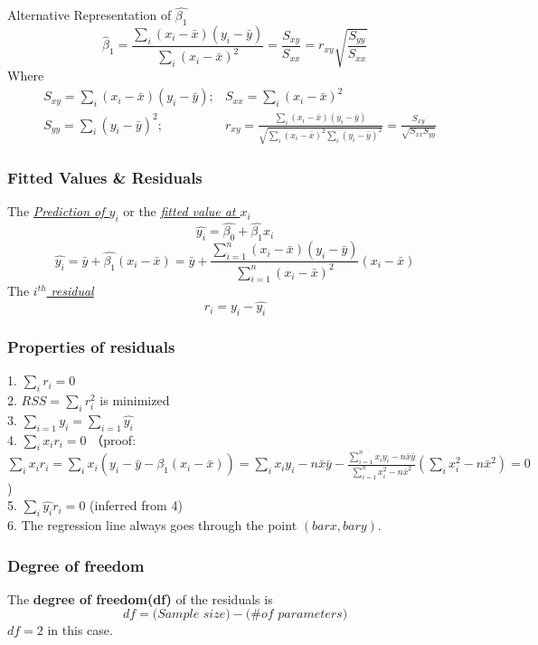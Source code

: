 \documentclass[11pt,a4paper]{article}
\begin{document}
Alternative Representation of $\hat{\beta_1}$
$$\hat{\beta}_{1}=\frac{\sum_{i}\left(x_{i}-\bar{x}\right)\left(y_{i}-\bar{y}\right)}{\sum_{i}\left(x_{i}-\bar{x}\right)^{2}}=\frac{S_{x y}}{S_{x x}}=r_{x y} \sqrt{\frac{S_{y y}}{S_{x x}}}$$
Where 
\begin{equation}
    \begin{aligned}
        &S_{xy}=\sum_{i}\left(x_{i}-\bar{x}\right)\left(y_{i}-\bar{y}\right); &S_{xx}=\sum_{i}\left(x_{i}-\bar{x}\right)^{2}\\
        &S_{yy}=\sum_{i}\left(y_{i}-\bar{y}\right)^{2}; &r_{xy}=\frac{\sum_{i}\left(x_{i}-\bar{x}\right)\left(y_{i}-\bar{y}\right)}{\sqrt{\sum_{i}\left(x_{i}-\bar{x}\right)^{2}\sum_{i}\left(y_{i}-\bar{y}\right)^{2}}}=\frac{S_{xy}}{\sqrt{S_{xx}S_{yy}}}
    \end{aligned}
    \nonumber
\end{equation}

\subsubsection{Fitted Values \& Residuals}
The \underline{\textit{Prediction of $y_i$}} or the \underline{\textit{fitted value at $x_i$}}
$$\hat{y_i}=\hat{\beta_0}+\hat{\beta_1}x_i$$
$$\hat{y_i}=\bar{y}+\hat{\beta_1}(x_i-\bar{x})=\bar{y}+\frac{\sum_{i=1}^{n}\left(x_{i}-\bar{x}\right)\left(y_{i}-\bar{y}\right)}{\sum_{i=1}^{n}\left(x_{i}-\bar{x}\right)^{2}}(x_i-\bar{x})$$
The \underline{\textit{$i^{th}$ residual}}
$$r_i=y_i-\hat{y_i}$$

\subsubsection{Properties of residuals}
1. $\sum_i r_i=0$\\
2. $RSS=\sum_i r_i^2$ is minimized\\
3. $\sum_{i=1}y_i=\sum_{i=1}\hat{y_i}$\\
4. $\sum_ix_ir_i=0$ （proof: $\sum_ix_ir_i=\sum_ix_i(y_i-\bar{y}-\hat{\beta_1}(x_i-\bar{x}))=\sum_ix_iy_i-n\bar{x}\bar{y}-\frac{\sum_{i=1}^{n} x_{i} y_{i}-n \bar{x} \bar{y}}{\sum_{i=1}^{n} x_{i}^{2}-n \bar{x}^{2}}(\sum_ix_i^2-n\bar{x}^2)=0$)\\
5. $\sum_i \hat{y_i} r_i=0$ (inferred from 4)\\
6. The regression line always goes through the point $(bar{x},bar{y})$.

\subsubsection{Degree of freedom}
The \textbf{degree of freedom(df)} of the residuals is
$$df=\textit{(Sample size)}-\textit{(\# of parameters)}$$
$df=2$ in this case.
\end{document}
